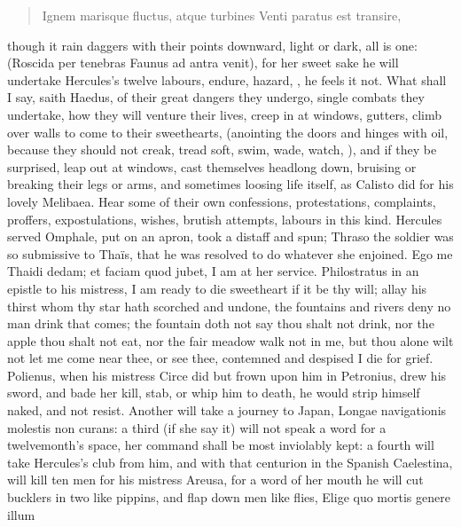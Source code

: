 \begin{latin}
\begin{verse}
Ignem marisque fluctus, atque turbines
Venti paratus est transire,
\end{verse}
\end{latin}

though it rain daggers with their points downward, light or dark, all
is one: (Roscida per tenebras Faunus ad antra venit), for her sweet
sake he will undertake Hercules's twelve labours, endure, hazard, \etc{},
he feels it not. What shall I say, saith Haedus, of their great
dangers they undergo, single combats they undertake, how they will
venture their lives, creep in at windows, gutters, climb over walls to
come to their sweethearts, (anointing the doors and hinges with oil,
because they should not creak, tread soft, swim, wade, watch, \etc{}), and
if they be surprised, leap out at windows, cast themselves headlong
down, bruising or breaking their legs or arms, and sometimes loosing
life itself, as Calisto did for his lovely Melibaea. Hear some of their
own confessions, protestations, complaints, proffers, expostulations,
wishes, brutish attempts, labours in this kind. Hercules served
Omphale, put on an apron, took a distaff and spun; Thraso the soldier
was so submissive to Thaïs, that he was resolved to do whatever she
enjoined. Ego me Thaidi dedam; et faciam quod jubet, I am at her
service. Philostratus in an epistle to his mistress, I am ready
to die sweetheart if it be thy will; allay his thirst whom thy star
hath scorched and undone, the fountains and rivers deny no man drink
that comes; the fountain doth not say thou shalt not drink, nor the
apple thou shalt not eat, nor the fair meadow walk not in me, but thou
alone wilt not let me come near thee, or see thee, contemned and
despised I die for grief. Polienus, when his mistress Circe did but
frown upon him in Petronius, drew his sword, and bade her kill,
stab, or whip him to death, he would strip himself naked, and not
resist. Another will take a journey to Japan, Longae navigationis
molestis non curans: a third (if she say it) will not speak a word for
a twelvemonth's space, her command shall be most inviolably kept: a
fourth will take Hercules's club from him, and with that centurion in
the Spanish Caelestina, will kill ten men for his mistress
Areusa, for a word of her mouth he will cut bucklers in two like
pippins, and flap down men like flies, Elige quo mortis genere illum
